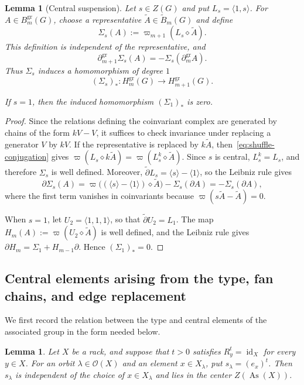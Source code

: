 \documentclass[10pt,a4paper]{amsart}
\newtheorem{lemma}[theorem]{Lemma}
\DeclareMathOperator{\As}{As}
\newcommand{\OO}{\mathcal O}
\newcommand{\tB}{\widetilde B}
\newcommand{\td}{\widetilde\partial}
\newcommand{\gr}{\mathrm{gr}}
\begin{document}
\begin{lemma}[Central suspension]
\label{lem:center-suspension}
Let $s\in Z(G)$ and put $L_s=\langle1,s\rangle$. For
$A\in B_m^{\gr}(G)$, choose a representative
$\widetilde A\in\tB_m(G)$ and define
\[
 \Sigma_s(A)
 :=\varpi_{m+1}(L_s\diamond\widetilde A).
\]
This definition is independent of the representative, and
\[
 \partial_{m+1}^{\gr}\Sigma_s(A)
 =-\Sigma_s(\partial_m^{\gr}A).
\]
Thus $\Sigma_s$ induces a homomorphism of degree $1$
\[
 (\Sigma_s)_*\colon H_m^{\gr}(G)\longrightarrow H_{m+1}^{\gr}(G).
\]

If $s=1$, then the induced homomorphism $(\Sigma_1)_*$ is zero.
\end{lemma}

\begin{proof}
Since the relations defining the coinvariant complex are generated by chains of the form $kV-V$, it suffices to check invariance under replacing a generator $V$ by $kV$. If the representative is replaced by $k\widetilde A$, then~\eqref{eq:shuffle-conjugation} gives
$\varpi(L_s\diamond k\widetilde A)=\varpi(L_s^k\diamond\widetilde A)$. Since $s$ is central, $L_s^k=L_s$, and therefore $\Sigma_s$ is well defined. Moreover, $\td L_s=\langle s\rangle-\langle1\rangle$, so the Leibniz rule gives
\[
 \partial\Sigma_s(A)
 =\varpi\bigl((\langle s\rangle-\langle1\rangle)\diamond\widetilde A\bigr)
  -\Sigma_s(\partial A)
 =-\Sigma_s(\partial A),
\]
where the first term vanishes in coinvariants because $\varpi(s\widetilde A-\widetilde A)=0$.

When $s=1$, let $U_2=\langle1,1,1\rangle$, so that $\td U_2=L_1$. The map $H_m(A):=\varpi(U_2\diamond\widetilde A)$ is well defined, and the Leibniz rule gives
$\partial H_m=\Sigma_1+H_{m-1}\partial$. Hence $(\Sigma_1)_*=0$.
\end{proof}

\subsection{Central elements arising from the type, fan chains, and edge replacement}
\label{subsec:fan-edge-replacement}

We first record the relation between the type and central elements of the associated group in the form needed below.

\begin{lemma}
\label{lem:central-type}
Let $X$ be a rack, and suppose that $t>0$ satisfies $R_y^t=\operatorname{id}_X$ for every $y\in X$. For an orbit $\lambda\in\OO(X)$ and an element $x\in X_\lambda$, put $s_\lambda=(e_x)^t$. Then $s_\lambda$ is independent of the choice of $x\in X_\lambda$ and lies in the center $Z(\As(X))$.
\end{lemma}
\end{document}
